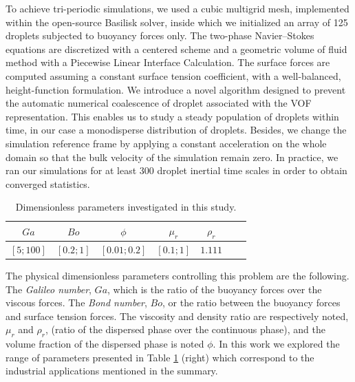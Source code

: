 \documentclass[9pt,a4paper]{article}
\begin{document}
To achieve tri-periodic simulations, we used a cubic multigrid mesh, implemented within the open-source Basilisk solver,
inside which we initialized an array of 125 droplets subjected to buoyancy forces only. 
The two-phase Navier--Stokes equations are discretized with a centered scheme and a geometric volume of fluid method with a Piecewise Linear Interface Calculation. The surface forces are computed assuming a constant surface tension coefficient, with a well-balanced, height-function formulation.
We introduce a novel algorithm designed to prevent the automatic numerical coalescence of droplet associated with the VOF representation.
This enables us to study a steady population of droplets within time, in our case a monodisperse distribution of droplets.
Besides, we change the simulation reference frame by applying a constant acceleration on the whole domain so that the bulk velocity of the simulation remain zero.
In practice, we ran our simulations for at least 300 droplet inertial time scales in order to obtain converged statistics.

\begin{table}[h!]
    \centering

    \begin{tabular}{ccccccc}\hline
        $Ga$&$Bo$&$\phi$&$ \mu_r$&$\rho_r$\\ \hline\hline
        $[5;100]$&$[0.2;1]$&$[0.01;0.2]$&$[0.1;1]$&$1.111$\\ \hline
    \end{tabular}
    \vfill
    
    \caption{Dimensionless parameters investigated in this study.}
    \label{fig:pic}
\end{table}
The physical dimensionless parameters controlling this problem are the following. 
The \textit{Galileo number}, $Ga$, which is the ratio of the buoyancy forces over
the viscous forces.
The \textit{Bond number}, $Bo$, or the ratio between the buoyancy forces and surface tension forces.
The viscosity and density ratio are respectively noted, $\mu_r$ and $\rho_r$, (ratio of the dispersed phase over the continuous phase),
and the volume fraction of the dispersed phase is noted $\phi$. 
In this work we explored the range of parameters presented in Table \ref{fig:pic} (right) which correspond to the industrial applications mentioned in the summary.
\end{document}
